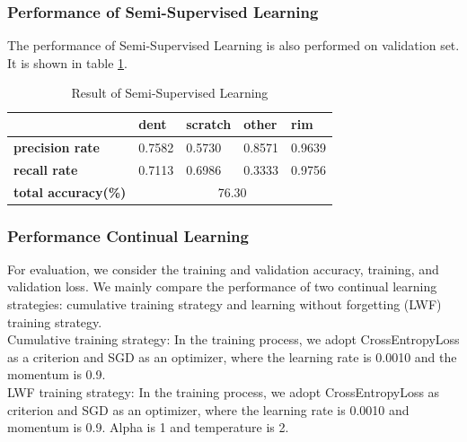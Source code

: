 \documentclass[lang=english,inputenc=utf8,fontsize=10pt]{ldvarticle}
\begin{document}
\subsubsection{Performance of Semi-Supervised Learning}
The performance of Semi-Supervised Learning is also performed on validation set. It is shown in table \ref{semi performance}. \\
\begin{table}[ht]   
    \begin{center}   
    \caption{Result of Semi-Supervised Learning}  
    \label{semi performance} 
    \begin{tabular}{|m{2cm}<{\centering}|m{2cm}<{\centering}|m{2.0cm}<{\centering}|m{2cm}<{\centering}|m{2cm}<{\centering}|}   
    \hline   &\textbf{dent} & \textbf{scratch} & \textbf{other} & \textbf{rim}\\ 
    \hline   \textbf{precision rate}  & 0.7582 & 0.5730 & 0.8571 & 0.9639  \\ 
    \hline   \textbf{recall rate} & 0.7113 & 0.6986 & 0.3333 & 0.9756   \\  
    \hline   \textbf{total accuracy(\%)} & \multicolumn{4}{|c|}{76.30} \\  
    \hline 
    \end{tabular}   
    \end{center}   
\end{table}

\subsubsection{Performance Continual Learning}
For evaluation, we consider the training and validation accuracy, training, and validation loss.  We mainly compare the performance of two continual learning strategies: cumulative training strategy and learning without forgetting (LWF) training strategy. \\

Cumulative training strategy:
In the training process, we adopt CrossEntropyLoss as a criterion and SGD as an optimizer, where the learning rate is 0.0010 and the momentum is 0.9.\\

LWF training strategy: In the training process, we adopt CrossEntropyLoss as criterion and SGD as an optimizer, where the learning rate is 0.0010 and momentum is 0.9. Alpha is 1 and temperature is 2.\\

\end{document}
